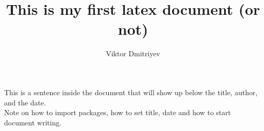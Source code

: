 \documentclass[11pt]{article}
\title{This is my first latex document (or not)}
\author{Viktor Dmitriyev}
\begin{document}
\maketitle

This is a sentence inside the document that will show up below the title, author, and the date. \\

Note on how to import packages, how to set title, date and how to start document writing.
\end{document}
